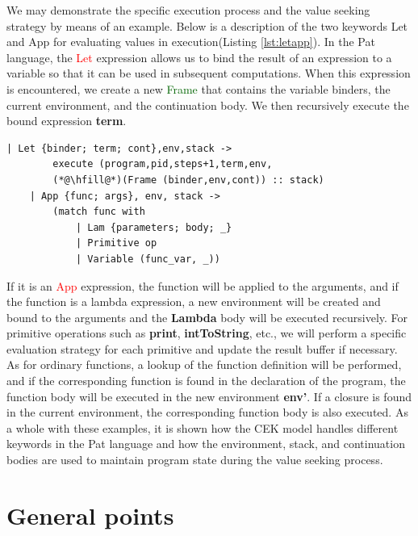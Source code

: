 \documentclass{l4proj}
\begin{document}
We may demonstrate the specific execution process and the value seeking strategy by means of an example. Below is a description of the two keywords Let and App for evaluating values in execution(Listing \ref{lst:letapp}). In the Pat language, the \textcolor{red}{Let} expression allows us to bind the result of an expression to a variable so that it can be used in subsequent computations. When this expression is encountered, we create a new \textcolor{darkgreen}{Frame} that contains the variable binders, the current environment, and the continuation body. We then recursively execute the bound expression \textbf{term}.

\noindent\begin{minipage}{\linewidth}
\lstset{style=Ocamlstyle}
\begin{lstlisting}[caption={Let and App Keyword Specific Implementation}, label={lst:letapp}]
    | Let {binder; term; cont},env,stack ->
        execute (program,pid,steps+1,term,env,
        (*@\hfill@*)(Frame (binder,env,cont)) :: stack)
    | App {func; args}, env, stack -> 
        (match func with
            | Lam {parameters; body; _} 
            | Primitive op
            | Variable (func_var, _))
\end{lstlisting}
\end{minipage}

If it is an \textcolor{red}{App} expression, the function will be applied to the arguments, and if the function is a lambda expression, a new environment will be created and bound to the arguments and the \textbf{Lambda} body will be executed recursively. For primitive operations such as \textbf{print}, \textbf{intToString}, etc., we will perform a specific evaluation strategy for each primitive and update the result buffer if necessary. As for ordinary functions, a lookup of the function definition will be performed, and if the corresponding function is found in the declaration of the program, the function body will be executed in the new environment \textbf{env'}. If a closure is found in the current environment, the corresponding function body is also executed. As a whole with these examples, it is shown how the CEK model handles different keywords in the Pat language and how the environment, stack, and continuation bodies are used to maintain program state during the value seeking process.

\section{General points}
\end{document}
